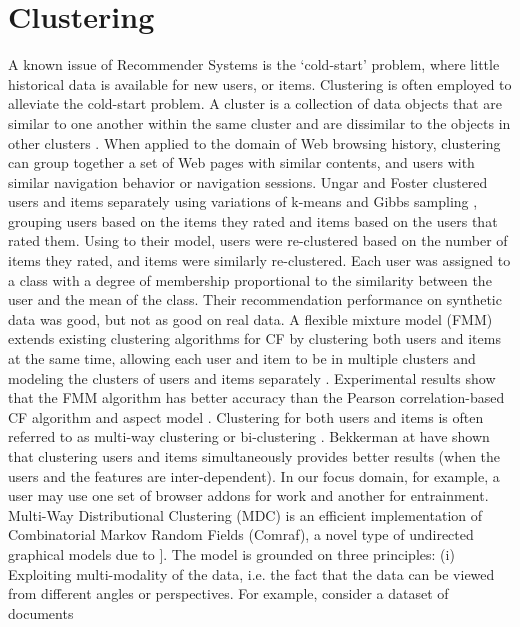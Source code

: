 \documentclass[11pt,oneside]{book}
\let\Oldsection\section
\renewcommand{\section}{\FloatBarrier\Oldsection}
\begin{document}
\section{Clustering}

A known issue of Recommender Systems is the `cold-start' problem,
where little historical data is available for new users, or
items. Clustering is often employed to alleviate the cold-start
problem. A cluster is a collection of data objects that are similar to
one another within the same cluster and are dissimilar to the objects
in other clusters \citep{han2006data}. When applied to the domain of Web browsing
history, clustering can group together a set of Web pages with similar
contents, and users with similar navigation behavior or navigation
sessions. Ungar and Foster \citep{ungar1998clustering} clustered users and items separately
using variations of k-means and Gibbs sampling \citep{geman1984stochastic}, grouping users
based on the items they rated and items based on the users that rated
them. Using to their model, users were re-clustered based on the
number of items they rated, and items were similarly
re-clustered. Each user was assigned to a class with a degree of
membership proportional to the similarity between the user and the
mean of the class. Their recommendation performance on synthetic data
was good, but not as good on real data. A flexible mixture model (FMM)
extends existing clustering algorithms for CF by clustering both users
and items at the same time, allowing each user and item to be in
multiple clusters and modeling the clusters of users and items
separately \citep{si03}. Experimental results show that the FMM algorithm has
better accuracy than the Pearson correlation-based CF algorithm and
aspect model \citep{hofmann2004latent}. Clustering for both users and items is often
referred to as multi-way clustering \citep{bekkerman05} or bi-clustering \citep{zhu2009analyzing}.
Bekkerman at \citep{bekkerman05} have shown that clustering users and items
simultaneously provides better results (when the users and the
features are inter-dependent). In our focus domain, for example, a
user may use one set of browser addons for work and another for
entrainment. Multi-Way Distributional Clustering (MDC) is an efficient
implementation of Combinatorial Markov Random Fields (Comraf), a novel
type of undirected graphical models due to \citep{bekkerman2006semi}]. The
model is grounded on three principles: (i) Exploiting multi-modality
of the data, i.e. the fact that the data can be viewed from different
angles or perspectives. For example, consider a dataset of documents
\end{document}
